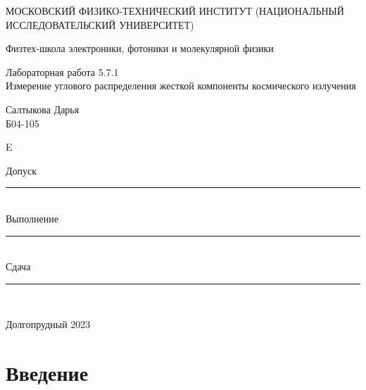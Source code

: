 \documentclass[a4paper,12pt]{article} %
\begin{document}
\newenvironment{lines}[1][\textwidth] %
{
\newcolumntype{E}{>{}p{#1}<{\hrulefill}} %
\begin{flushright} %
\begin{tabular}[h]{E} %
}
{\end{tabular}\end{flushright}
}
	
	\begin{titlepage}
	\begin{center}
		{\large МОСКОВСКИЙ ФИЗИКО-ТЕХНИЧЕСКИЙ ИНСТИТУТ (НАЦИОНАЛЬНЫЙ ИССЛЕДОВАТЕЛЬСКИЙ УНИВЕРСИТЕТ)}
	\end{center}
	\begin{center}
		{\large Физтех-школа электроники, фотоники и молекулярной физики}
	\end{center}
	
	
	\vspace{4.5cm}
	{\huge
		\begin{center}
			{Лабораторная работа 5.7.1}\\
			Измерение углового распределения жесткой компоненты космического излучения
		\end{center}
	}
	\vspace{2cm}
	\begin{flushright}
		{\LARGE Салтыкова Дарья \\
			\vspace{0.5cm}
			Б04-105}
	\end{flushright}
	
	\vspace{0.5cm}
	
	\begin{lines}[.5
	\textwidth]
  {\LARGE Допуск} \rule{6.5cm}{0.25pt} \vspace{0.5cm}\\
 {\LARGE Выполнение} \rule{3cm}{0.25pt}\vspace{0.5cm} \\ {\LARGE Сдача} \rule{3cm}{0.25pt} \\ %
\end{lines}
	\vspace{6cm}
	\begin{center}
		Долгопрудный 2023
	\end{center}
\end{titlepage}

\section{Введение}
\end{document}
